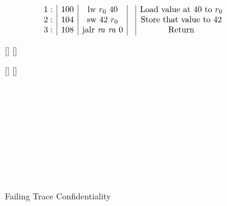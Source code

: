\documentclass[acmsmall,review,anonymous]{acmart}\settopmatter{printfolios=true,printccs=false,printacmref=false}
\begin{document}
\begin{figure}
  \[
  \begin{array}{r|c|c|c|c}
    1: & 100 & \text{lw} ~ r_0 ~ 40 &  & \text{Load value at 40 to $r_0$}\\
    2: & 104 & \text{sw} ~ 42 ~ r_0 &  & \text{Store that value to 42}\\
    3: & 108 & \text{jalr} ~ \mathit{ra} ~ \mathit{ra} ~ 0 &  & \text{Return}\\
  \end{array}
  \]

  \begin{minipage}{.49\textwidth}
    \begin{center}
      [{\makebox[0pt]{\(\HIGHSEC\)}}]%
      [{\makebox[0pt]{\(\LOWSEC\)}}]%
      \\
    \end{center}
  \end{minipage}
  \begin{minipage}{.49\textwidth}
    \begin{center}
      [{\makebox[0pt]{\(\HIGHSEC\)}}]%
      [{\makebox[0pt]{\(\LOWSEC\)}}]%
      \\
    \end{center}
  \end{minipage} \\
  ~\\
  ~\\
 \begin{minipage}{.49\textwidth}
    \begin{center}
      \\
    \end{center}
  \end{minipage}
  \begin{minipage}{.49\textwidth}
    \begin{center}
      \\
    \end{center}
  \end{minipage} \\


  \caption{Failing Trace Confidentiality}
  \label{fig:lazyex1}
\end{figure}
\end{document}
